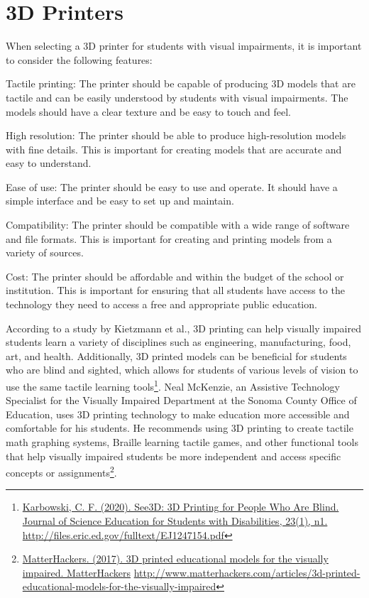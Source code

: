 \pagebreak \hypertarget{d-print-equipment}{}\section{3D Printers}\label{d-print-equipment}
When selecting a 3D printer for students with visual impairments, it is important to consider the following features:

Tactile printing: The printer should be capable of producing 3D models that are tactile and can be easily understood by students with visual impairments. The models should have a clear texture and be easy to touch and feel.

High resolution: The printer should be able to produce high-resolution models with fine details. This is important for creating models that are accurate and easy to understand.

Ease of use: The printer should be easy to use and operate. It should have a simple interface and be easy to set up and maintain.

Compatibility: The printer should be compatible with a wide range of software and file formats. This is important for creating and printing models from a variety of sources.

Cost: The printer should be affordable and within the budget of the school or institution. This is important for ensuring that all students have access to the technology they need to access a free and appropriate public education.

According to a study by Kietzmann et al., 3D printing can help visually impaired students learn a variety of disciplines such as engineering, manufacturing, food, art, and health. Additionally, 3D printed models can be beneficial for students who are blind and sighted, which allows for students of various levels of vision to use the same tactile learning tools\footnote{\raggedright \href{http://files.eric.ed.gov/fulltext/EJ1247154.pdf}{Karbowski, C. F. (2020). See3D: 3D Printing for People Who Are Blind. Journal of Science Education for Students with Disabilities, 23(1), n1.} \url{http://files.eric.ed.gov/fulltext/EJ1247154.pdf}}. Neal McKenzie, an Assistive Technology Specialist for the Visually Impaired Department at the Sonoma County Office of Education, uses 3D printing technology to make education more accessible and comfortable for his students. He recommends using 3D printing to create tactile math graphing systems, Braille learning tactile games, and other functional tools that help visually impaired students be more independent and access specific concepts or assignments\footnote{\raggedright \raggedright\href{http://www.matterhackers.com/articles/3d-printed-educational-models-for-the-visually-impaired}{MatterHackers. (2017). 3D printed educational models for the visually impaired. MatterHackers} \hfill\break\url{http://www.matterhackers.com/articles/3d-printed-educational-models-for-the-visually-impaired}}. 

